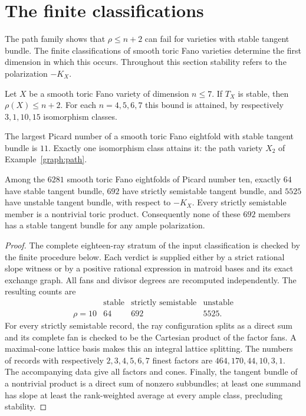 \section{The finite classifications}\label{sec:computation}

The path family shows that $\rho\le n+2$ can fail for varieties with
stable tangent bundle. The finite classifications of smooth toric Fano
varieties determine the first dimension in which this occurs.
Throughout this section stability refers to the polarization $-K_X$.

\begin{theorem}\label{census:lowdim}
Let $X$ be a smooth toric Fano variety of dimension $n\le7$.
If $T_X$ is stable, then $\rho(X)\le n+2$.
For each $n=4,5,6,7$ this bound is attained, by respectively
$3,1,10,15$ isomorphism classes.
\end{theorem}

\begin{theorem}\label{census:eight}
The largest Picard number of a smooth toric Fano eightfold with stable
tangent bundle is $11$.  Exactly one isomorphism class attains it:
the path variety $X_2$ of Example~\ref{graph:path}.
\end{theorem}

\begin{proposition}\label{census:picardten}
Among the $6281$ smooth toric Fano eightfolds of Picard number ten,
exactly $64$ have stable tangent bundle, $692$ have strictly semistable
tangent bundle, and $5525$ have unstable tangent bundle, with respect
to $-K_X$. Every strictly semistable member is a nontrivial toric
product. Consequently none of these $692$ members has a stable tangent
bundle for any ample polarization.
\end{proposition}

\begin{proof}
The complete eighteen-ray stratum of the input classification is
checked by the finite procedure below. Each verdict is supplied either
by a strict rational slope witness or by a positive rational expression
in matroid bases and its exact exchange graph. All fans and divisor
degrees are recomputed independently. The resulting counts are
\[
\begin{array}{c|rrr}
 &\text{stable}&\text{strictly semistable}&\text{unstable}\\\hline
\rho=10&64&692&5525.
\end{array}
\]
For every strictly semistable record, the ray configuration splits
as a direct sum and its complete fan is checked to be the Cartesian
product of the factor fans. A maximal-cone lattice basis makes this
an integral lattice splitting. The numbers of records with respectively
$2,3,4,5,6,7$ finest factors are $464,170,44,10,3,1$.
The accompanying data give all factors and cones. Finally, the tangent
bundle of a nontrivial product is a direct sum of nonzero subbundles;
at least one summand has slope at least the rank-weighted average at
every ample class, precluding stability.
\end{proof}

